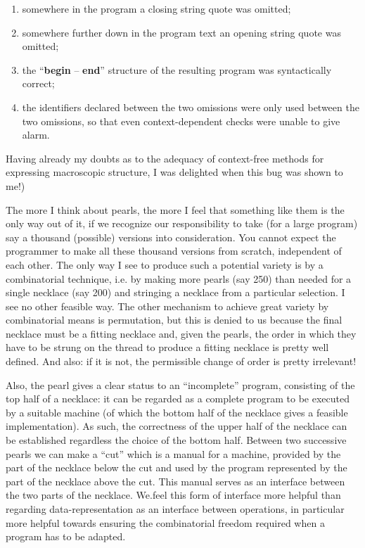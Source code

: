 \begin{enumerate}[label=(\arabic*)]
	\item somewhere in the program a closing string quote was omitted;
	
	\item somewhere further down in the program text an opening string quote was omitted;
	
	\item the ``\textbf{begin} -- \textbf{end}'' structure of the resulting program was syntactically correct;
	
	\item the identifiers declared between the two omissions were only used 	between the two omissions, so that even context-dependent checks were 	unable to give alarm.
\end{enumerate}

\noindent
Having already my doubts as to the adequacy of context-free methods for expressing macroscopic structure, I was delighted when this bug was shown to me!)

The more I think about pearls, the more I feel that something like them is the only way out of it, if we recognize our responsibility to take (for a large program) say a thousand (possible) versions into consideration. You cannot expect the programmer to make all these thousand versions from scratch, independent of each other. The only way I see to produce such a potential variety is by a combinatorial technique, i.e. by making more pearls (say 250) than needed for a single necklace (say 200) and stringing a necklace from a particular selection. I see no other feasible way. The other mechanism to achieve great variety by combinatorial means is permutation, but this is denied to us because the final necklace must be a fitting necklace and, given the pearls, the order in which they have to be strung on the thread to produce a fitting necklace is pretty well defined. And also: if it is not, the permissible change of order is pretty irrelevant!

Also, the pearl gives a clear status to an ``incomplete'' program, consisting of the top half of a necklace: it can be regarded as a complete program to be executed by a suitable machine (of which the bottom half of the necklace gives a feasible implementation). As such, the correctness of the upper half of the necklace can be established regardless the choice of the bottom half. Between two successive pearls we can make a ``cut'' which is a manual for a machine, provided by the part of the necklace below the cut and used by the program represented by the part of the necklace above the cut. This manual serves as an interface between the two parts of the necklace. We.feel this form of interface more helpful than regarding data-representation as an interface between operations, in particular more helpful towards ensuring the combinatorial freedom required when a program has to be adapted.

